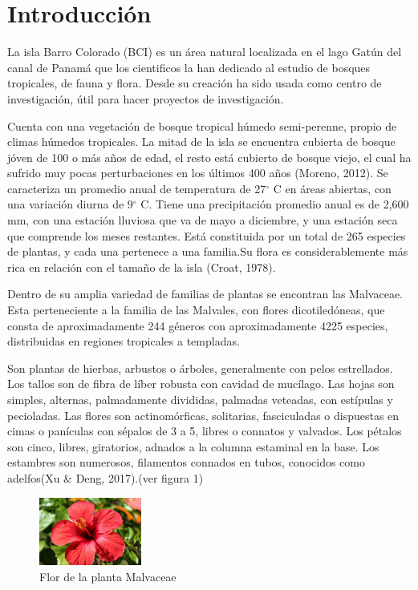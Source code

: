 \documentclass[11pt,]{article}
\begin{document}
\vskip 6.5pt


\noindent  \section{Introducción}\label{introducciuxf3n}

La isla Barro Colorado (BCI) es un área natural localizada en el lago
Gatún del canal de Panamá que los cientificos la han dedicado al estudio
de bosques tropicales, de fauna y flora. Desde su creación ha sido usada
como centro de investigación, útil para hacer proyectos de
investigación.

Cuenta con una vegetación de bosque tropical húmedo semi-perenne, propio
de climas húmedos tropicales. La mitad de la isla se encuentra cubierta
de bosque jóven de 100 o más años de edad, el resto está cubierto de
bosque viejo, el cual ha sufrido muy pocas perturbaciones en los últimos
400 años (Moreno, 2012). Se caracteriza un promedio anual de temperatura
de 27\(^{\circ}\) C en áreas abiertas, con una variación diurna de
9\(^{\circ}\) C. Tiene una precipitación promedio anual es de 2,600 mm,
con una estación lluviosa que va de mayo a diciembre, y una estación
seca que comprende los meses restantes. Está constituida por un total de
265 especies de plantas, y cada una pertenece a una familia.Su flora es
considerablemente más rica en relación con el tamaño de la isla (Croat,
1978).

Dentro de su amplia variedad de familias de plantas se encontran las
Malvaceae. Esta perteneciente a la familia de las Malvales, con flores
dicotiledóneas, que consta de aproximadamente 244 géneros con
aproximadamente 4225 especies, distribuidas en regiones tropicales a
templadas.

Son plantas de hierbas, arbustos o árboles, generalmente con pelos
estrellados. Los tallos son de fibra de líber robusta con cavidad de
mucílago. Las hojas son simples, alternas, palmadamente divididas,
palmadas veteadas, con estípulas y pecioladas. Las flores son
actinomórficas, solitarias, fasciculadas o dispuestas en cimas o
panículas con sépalos de 3 a 5, libres o connatos y valvados. Los
pétalos son cinco, libres, giratorios, adnados a la columna estaminal en
la base. Los estambres son numerosos, filamentos connados en tubos,
conocidos como adelfos(Xu \& Deng, 2017).(ver figura 1)

\begin{figure}
\centering
\includegraphics[width=0.30000\textwidth]{Hibiscus-Malvaceae.jpg}
\caption{Flor de la planta Malvaceae}
\end{figure}
\end{document}
